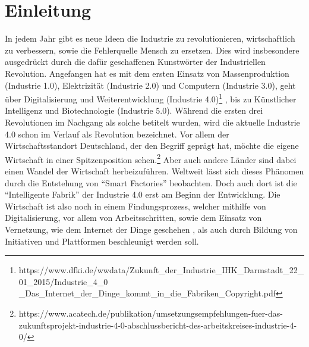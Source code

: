 \chapter{Einleitung}



In jedem Jahr gibt es neue Ideen die Industrie zu revolutionieren, wirtschaftlich zu verbessern, sowie die Fehlerquelle Mensch zu ersetzen. Dies wird insbesondere ausgedrückt durch die dafür geschaffenen Kunstwörter der Industriellen Revolution. Angefangen hat es mit dem ersten Einsatz von Massenproduktion (Industrie 1.0), Elektrizität (Industrie 2.0) und Computern (Industrie 3.0), geht über Digitalisierung und Weiterentwicklung (Industrie 4.0)\footnote{https://www.dfki.de/wwdata/Zukunft\_der\_Industrie\_IHK\_Darmstadt\_22\_01\_2015/Industrie\_4\_0\\\_Das\_Internet\_der\_Dinge\_kommt\_in\_die\_Fabriken\_Copyright.pdf} , bis zu Künstlicher Intelligenz und Biotechnologie (Industrie 5.0). Während die ersten drei Revolutionen im Nachgang als solche betitelt wurden, wird die aktuelle Industrie 4.0 schon im Verlauf als Revolution bezeichnet. Vor allem der Wirtschaftsstandort Deutschland, der den Begriff geprägt hat, möchte die eigene Wirtschaft in einer Spitzenposition sehen.\footnote{https://www.acatech.de/publikation/umsetzungsempfehlungen-fuer-das-zukunftsprojekt-industrie-4-0-abschlussbericht-des-arbeitskreises-industrie-4-0/} Aber auch andere Länder sind dabei einen Wandel der Wirtschaft herbeizuführen. Weltweit lässt sich dieses Phänomen durch die Entstehung von \enquote{Smart Factories} beobachten. Doch auch dort ist die \enquote{Intelligente Fabrik} der Industrie 4.0 erst am Beginn der Entwicklung. Die Wirtschaft ist also noch in einem Findungsprozess, welcher mithilfe von Digitalisierung, vor allem von Arbeitsschritten, sowie dem Einsatz von Vernetzung, wie dem Internet der Dinge geschehen , als auch durch Bildung von Initiativen und Plattformen beschleunigt werden soll.

